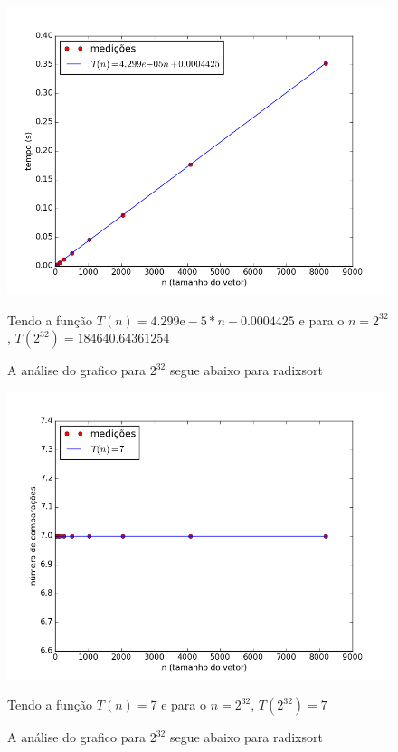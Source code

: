 \documentclass[12pt,a4paper,twoside]{report}
\begin{document}


\begin{figure}[ht]
\centering \includegraphics[scale=0.8]{../radixsort/imagens/radixsortQuaseCresc200.png}
\caption{A análise do grafico para $2^{32}$ segue abaixo para radixsort}

Tendo a função $T(n) = 4.299\mathrm{e}-5*n-0.0004425$ e para o $n =2^{32}$, $T(2^{32}) =184640.64361254$
\label{fig:radixsortQuaseCresc200}
\end{figure}

\begin{figure}[ht]
\centering \includegraphics[scale=0.8]{../radixsort/imagens/radixsortQuaseCresc201.png}
\caption{A análise do grafico para $2^{32}$ segue abaixo para radixsort}

Tendo a função $T(n) = 7$ e para o $n =2^{32}$, $T(2^{32}) =7$
\label{fig:radixsortQuaseCresc201}
\end{figure}
\end{document}
